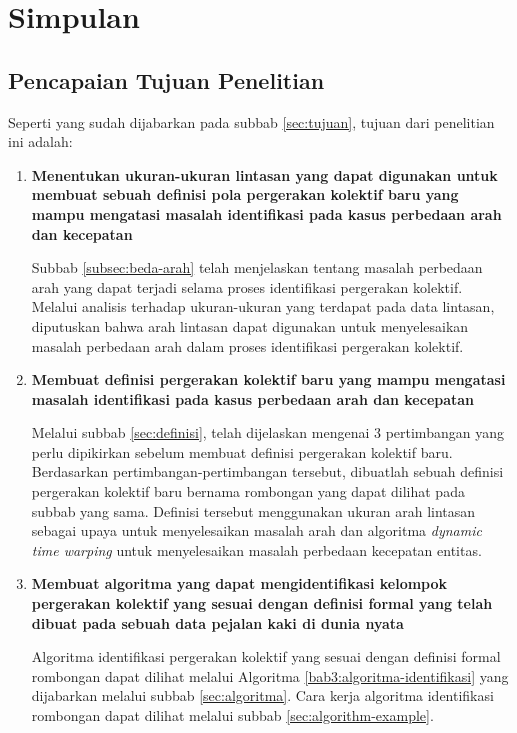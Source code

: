 \chapter{Simpulan}
\label{chap:simpulan}

\section{Pencapaian Tujuan Penelitian}
\label{sec:pencapaian-tujuan}

Seperti yang sudah dijabarkan pada subbab \ref{sec:tujuan}, tujuan dari penelitian ini adalah:

\begin{enumerate}
    \item \textbf{Menentukan ukuran-ukuran lintasan yang dapat digunakan untuk membuat sebuah definisi pola pergerakan kolektif baru yang mampu mengatasi masalah identifikasi pada kasus perbedaan arah dan kecepatan}
    
    Subbab \ref{subsec:beda-arah} telah menjelaskan tentang masalah perbedaan arah yang dapat terjadi selama proses identifikasi pergerakan kolektif. Melalui analisis terhadap ukuran-ukuran yang terdapat pada data lintasan, diputuskan bahwa arah lintasan dapat digunakan untuk menyelesaikan masalah perbedaan arah dalam proses identifikasi pergerakan kolektif.
    
    \item \textbf{Membuat definisi pergerakan kolektif baru yang mampu mengatasi masalah identifikasi pada kasus perbedaan arah dan kecepatan}
    
    Melalui subbab \ref{sec:definisi}, telah dijelaskan mengenai 3 pertimbangan yang perlu dipikirkan sebelum membuat definisi pergerakan kolektif baru. Berdasarkan pertimbangan-pertimbangan tersebut, dibuatlah sebuah definisi pergerakan kolektif baru bernama rombongan yang dapat dilihat pada subbab yang sama. Definisi tersebut menggunakan ukuran arah lintasan sebagai upaya untuk menyelesaikan masalah arah dan algoritma \textit{dynamic time warping} untuk menyelesaikan masalah perbedaan kecepatan entitas.
    
    \item \textbf{Membuat algoritma yang dapat mengidentifikasi kelompok pergerakan kolektif yang sesuai dengan definisi formal yang telah dibuat pada sebuah data pejalan kaki di dunia nyata}
    
    Algoritma identifikasi pergerakan kolektif yang sesuai dengan definisi formal rombongan dapat dilihat melalui Algoritma \ref{bab3:algoritma-identifikasi} yang dijabarkan melalui subbab \ref{sec:algoritma}. Cara kerja algoritma identifikasi rombongan dapat dilihat melalui subbab \ref{sec:algorithm-example}.
    

\end{enumerate}
